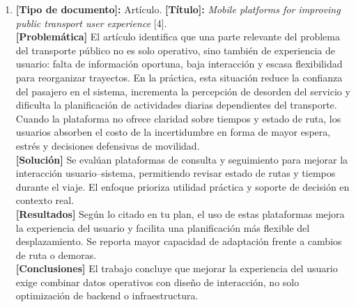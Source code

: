 \begin{enumerate}
    \item \textbf{[Tipo de documento]:} Artículo. \textbf{[Título]:} \textit{Mobile platforms for improving public transport user experience} [4].\\
    \textbf{[Problemática]} El art\'{i}culo identifica que una parte relevante del problema del transporte p\'{u}blico no es solo operativo, sino tambi\'{e}n de experiencia de usuario: falta de informaci\'{o}n oportuna, baja interacci\'{o}n y escasa flexibilidad para reorganizar trayectos. En la pr\'{a}ctica, esta situaci\'{o}n reduce la confianza del pasajero en el sistema, incrementa la percepci\'{o}n de desorden del servicio y dificulta la planificaci\'{o}n de actividades diarias dependientes del transporte. Cuando la plataforma no ofrece claridad sobre tiempos y estado de ruta, los usuarios absorben el costo de la incertidumbre en forma de mayor espera, estr\'{e}s y decisiones defensivas de movilidad.\\
    \textbf{[Solución]} Se evalúan plataformas de consulta y seguimiento para mejorar la interacción usuario--sistema, permitiendo revisar estado de rutas y tiempos durante el viaje. El enfoque prioriza utilidad práctica y soporte de decisión en contexto real.\\
    \textbf{[Resultados]} Según lo citado en tu plan, el uso de estas plataformas mejora la experiencia del usuario y facilita una planificación más flexible del desplazamiento. Se reporta mayor capacidad de adaptación frente a cambios de ruta o demoras.\\
    \textbf{[Conclusiones]} El trabajo concluye que mejorar la experiencia del usuario exige combinar datos operativos con diseño de interacción, no solo optimización de backend o infraestructura.


\end{enumerate}
